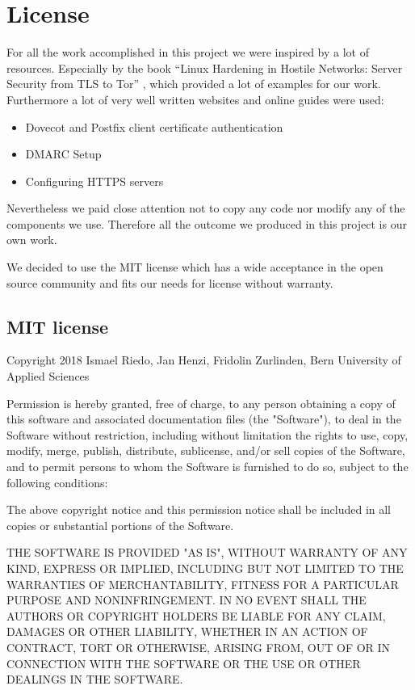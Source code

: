 \chapter{License}
For all the work accomplished in this project we were inspired by a lot of resources. Especially by the book \enquote{Linux Hardening in Hostile Networks: Server Security from TLS to Tor} \cite{rankin17}, which provided a lot of examples for our work. Furthermore a lot of very well written websites and online guides were used: 
\begin{itemize}
    \item{Dovecot and Postfix client certificate authentication \cite{mail-auth}}
    \item{DMARC Setup \cite{mail-dmarc}}
    \item{Configuring HTTPS servers \cite{nginx-ssl}}
\end{itemize}

Nevertheless we paid close attention not to copy any code nor modify any of the components we use. Therefore all the outcome we produced in this project is our own work.

We decided to use the MIT license which has a wide acceptance in the open source community and fits our needs for license without warranty.

\section{MIT license}
Copyright 2018 Ismael Riedo, Jan Henzi, Fridolin Zurlinden, Bern University of Applied Sciences

Permission is hereby granted, free of charge, to any person obtaining a copy of this software and associated documentation files (the "Software"), to deal in the Software without restriction, including without limitation the rights to use, copy, modify, merge, publish, distribute, sublicense, and/or sell copies of the Software, and to permit persons to whom the Software is furnished to do so, subject to the following conditions:

The above copyright notice and this permission notice shall be included in all copies or substantial portions of the Software.

THE SOFTWARE IS PROVIDED "AS IS", WITHOUT WARRANTY OF ANY KIND, EXPRESS OR IMPLIED, INCLUDING BUT NOT LIMITED TO THE WARRANTIES OF MERCHANTABILITY, FITNESS FOR A PARTICULAR PURPOSE AND NONINFRINGEMENT. IN NO EVENT SHALL THE AUTHORS OR COPYRIGHT HOLDERS BE LIABLE FOR ANY CLAIM, DAMAGES OR OTHER LIABILITY, WHETHER IN AN ACTION OF CONTRACT, TORT OR OTHERWISE, ARISING FROM, OUT OF OR IN CONNECTION WITH THE SOFTWARE OR THE USE OR OTHER DEALINGS IN THE SOFTWARE.
